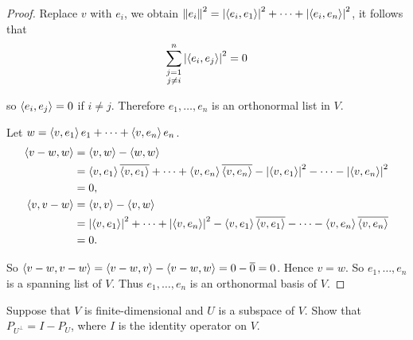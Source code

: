 \begin{proof}
    Replace $v$ with $e_{i}$, we obtain $\left\Vert{e_{i}}\right\Vert^{2} = \left\vert{\left\langle{e_{i}, e_{1}}\right\rangle}\right\vert^{2} + \cdots + \left\vert{\left\langle{e_{i}, e_{n}}\right\rangle}\right\vert^{2}$, it follows that
    \[
        \sum^{n}_{\substack{j=1 \\ j\ne i}} \left\vert{\left\langle{e_{i}, e_{j}}\right\rangle}\right\vert^{2} = 0
    \]

    so $\left\langle{e_{i}, e_{j}}\right\rangle = 0$ if $i\ne j$. Therefore $e_{1}, \ldots, e_{n}$ is an orthonormal list in $V$.

    Let $w = \left\langle{v,e_{1}}\right\rangle e_{1} + \cdots + \left\langle{v, e_{n}}\right\rangle e_{n}$.
    \begin{align*}
        \left\langle{v - w, w}\right\rangle & = \left\langle{v, w}\right\rangle - \left\langle{w, w}\right\rangle                                                                                                                                                   \\
                             & = \left\langle{v, e_{1}}\right\rangle\overline{\left\langle{v, e_{1}}\right\rangle} + \cdots + \left\langle{v, e_{n}}\right\rangle\overline{\left\langle{v, e_{n}}\right\rangle} - \left\vert{\left\langle{v, e_{1}}\right\rangle}\right\vert^{2} - \cdots - \left\vert{\left\langle{v, e_{n}}\right\rangle}\right\vert^{2} \\
                             & = 0,                                                                                                                                                                                    \\
        \left\langle{v, v - w}\right\rangle & = \left\langle{v, v}\right\rangle - \left\langle{v, w}\right\rangle                                                                                                                                                   \\
                             & = \left\vert{\left\langle{v, e_{1}}\right\rangle}\right\vert^{2} + \cdots + \left\vert{\left\langle{v, e_{n}}\right\rangle}\right\vert^{2} - \left\langle{v, e_{1}}\right\rangle\overline{\left\langle{v, e_{1}}\right\rangle} - \cdots - \left\langle{v, e_{n}}\right\rangle\overline{\left\langle{v, e_{n}}\right\rangle} \\
                             & = 0.
    \end{align*}

    So $\left\langle{v - w, v - w}\right\rangle = \left\langle{v - w, v}\right\rangle - \left\langle{v - w, w}\right\rangle = 0 - \overline{0} = 0$. Hence $v = w$. So $e_{1}, \ldots, e_{n}$ is a spanning list of $V$. Thus $e_{1}, \ldots, e_{n}$ is an orthonormal basis of $V$.
\end{proof}
\newpage

\begin{exercise}
    Suppose that $V$ is finite-dimensional and $U$ is a subspace of $V$. Show that $P_{U^{\bot}} = I - P_{U}$, where $I$ is the identity operator on $V$.
\end{exercise}

